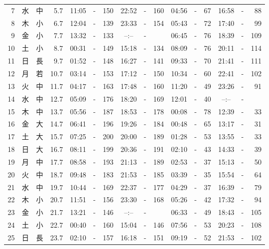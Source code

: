 \documentclass[12pt.a4j]{jsarticle}
\begin{document}
\begin{center}
\begin{table}[ht]
\begin{tabular}{|rc|cr|ccrccr|ccrccr|}
 7 & 水 & 中 &  5.7 &  11:05 &-& 150  &  22:52 &-& 160  &   04:56 &-&  67  &   16:58 &-&  88  \\
 8 & 木 & 小 &  6.7 &  12:04 &-& 139  &  23:33 &-& 154  &   05:43 &-&  72  &   17:40 &-&  99  \\
 9 & 金 & 小 &  7.7 &  13:32 &-& 133  &  --:-- &-&     &   06:45 &-&  76  &   18:39 &-& 109  \\
10 & 土 & 小 &  8.7 &  00:31 &-& 149  &  15:18 &-& 134  &   08:09 &-&  76  &   20:11 &-& 114  \\
11 & 日 & 長 &  9.7 &  01:52 &-& 148  &  16:27 &-& 141  &   09:33 &-&  70  &   21:41 &-& 111  \\
12 & 月 & 若 & 10.7 &  03:14 &-& 153  &  17:12 &-& 150  &   10:34 &-&  60  &   22:41 &-& 102  \\
13 & 火 & 中 & 11.7 &  04:17 &-& 163  &  17:48 &-& 160  &   11:20 &-&  49  &   23:26 &-&  91  \\
14 & 水 & 中 & 12.7 &  05:09 &-& 176  &  18:20 &-& 169  &   12:01 &-&  40  &   --:-- &-&     \\
15 & 木 & 中 & 13.7 &  05:56 &-& 187  &  18:53 &-& 178  &   00:08 &-&  78  &   12:39 &-&  33  \\
16 & 金 & 大 & 14.7 &  06:41 &-& 196  &  19:26 &-& 184  &   00:48 &-&  65  &   13:17 &-&  31  \\
17 & 土 & 大 & 15.7 &  07:25 &-& 200  &  20:00 &-& 189  &   01:28 &-&  53  &   13:55 &-&  33  \\
18 & 日 & 大 & 16.7 &  08:11 &-& 199  &  20:36 &-& 191  &   02:10 &-&  43  &   14:33 &-&  39  \\
19 & 月 & 中 & 17.7 &  08:58 &-& 193  &  21:13 &-& 189  &   02:53 &-&  37  &   15:13 &-&  50  \\
20 & 火 & 中 & 18.7 &  09:48 &-& 183  &  21:53 &-& 185  &   03:39 &-&  35  &   15:54 &-&  64  \\
21 & 水 & 中 & 19.7 &  10:44 &-& 169  &  22:37 &-& 177  &   04:29 &-&  37  &   16:39 &-&  79  \\
22 & 木 & 小 & 20.7 &  11:51 &-& 156  &  23:30 &-& 168  &   05:26 &-&  42  &   17:32 &-&  94  \\
23 & 金 & 小 & 21.7 &  13:21 &-& 146  &  --:-- &-&     &   06:33 &-&  49  &   18:43 &-& 105  \\
24 & 土 & 小 & 22.7 &  00:40 &-& 160  &  15:04 &-& 146  &   07:56 &-&  53  &   20:23 &-& 108  \\
25 & 日 & 長 & 23.7 &  02:10 &-& 157  &  16:18 &-& 151  &   09:19 &-&  52  &   21:53 &-& 102  \\

\end{tabular}
\end{table}
\end{center}
\end{document}
